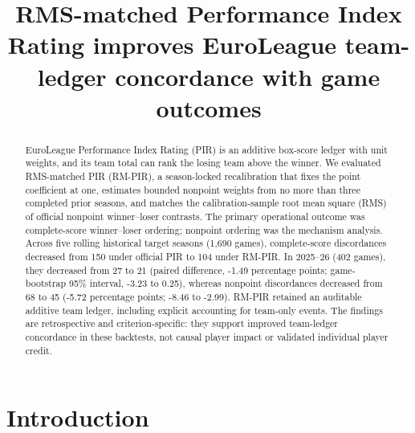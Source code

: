 \documentclass[pdflatex,sn-mathphys-num]{sn-jnl}
\begin{document}
\title[RM-PIR and team-ledger concordance]{RMS-matched Performance Index Rating improves EuroLeague team-ledger concordance with game outcomes}

\author*[1]{ }
\author[1]{ }
\author[1]{ }
\affil*[1]{\orgdiv{[Department]}, \orgname{[Institution]}, \orgaddress{\city{[City]}, \postcode{[Postcode]}, \country{[Country]}}}

\begin{abstract}
EuroLeague Performance Index Rating (PIR) is an additive box-score ledger with unit weights, and its team total can rank the losing team above the winner. We evaluated RMS-matched PIR (RM-PIR), a season-locked recalibration that fixes the point coefficient at one, estimates bounded nonpoint weights from no more than three completed prior seasons, and matches the calibration-sample root mean square (RMS) of official nonpoint winner--loser contrasts. The primary operational outcome was complete-score winner--loser ordering; nonpoint ordering was the mechanism analysis. Across five rolling historical target seasons (1,690 games), complete-score discordances decreased from 150 under official PIR to 104 under RM-PIR. In 2025--26 (402 games), they decreased from 27 to 21 (paired difference, -1.49 percentage points; game-bootstrap 95\% interval, -3.23 to 0.25), whereas nonpoint discordances decreased from 68 to 45 (-5.72 percentage points; -8.46 to -2.99). RM-PIR retained an auditable additive team ledger, including explicit accounting for team-only events. The findings are retrospective and criterion-specific: they support improved team-ledger concordance in these backtests, not causal player impact or validated individual player credit.
\end{abstract}


\maketitle

\section{Introduction}
\end{document}

